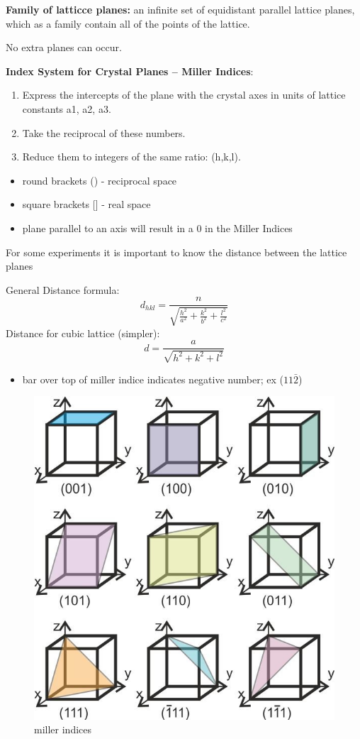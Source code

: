 \textbf{Family of latticce planes:} an infinite set of equidistant parallel lattice planes, which as a family contain all of the points of the lattice.

No extra planes can occur.

\textbf{Index System for Crystal Planes -- Miller Indices}:

\begin{enumerate}
    \item Express the intercepts of the plane with the crystal axes in units of lattice constants a1, a2, a3.
    \item Take the reciprocal of these numbers.
    \item Reduce them to integers of the same ratio: (h,k,l).
\end{enumerate}

\begin{itemize}
    \item round brackets () - reciprocal space
    \item square brackets [] - real space
\end{itemize}

\begin{itemize}
    \item plane parallel to an axis will result in a 0 in the Miller Indices
\end{itemize}

For some experiments it is important to know the distance between the lattice planes

General Distance formula:
\begin{equation}
    d_{hkl} = \frac{n}{\sqrt{\frac{h^2}{a^2}+\frac{k^2}{b^2}+\frac{l^2}{c^2}}}
\end{equation}
Distance for cubic lattice (simpler):
\begin{equation}
    d = \frac{a}{\sqrt{h^2+k^2+l^2}}
\end{equation}

\begin{itemize}
    \item bar over top of miller indice indicates negative number; ex ($11\bar{2}$)
\end{itemize}

\begin{figure}
  \centering
  \includegraphics[width=0.6\linewidth]{Images/miller-indices.png}
  \caption{miller indices}
  \label{fig:Miller-Indices}
\end{figure}
